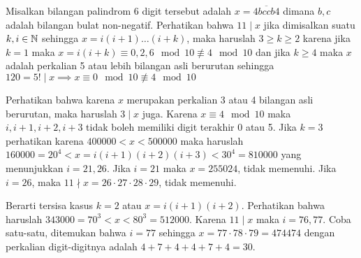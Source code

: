 
\begin{solusi}
    Misalkan bilangan palindrom 6 digit tersebut adalah $x=\overline{4bccb4}$ dimana $b,c$ adalah bilangan bulat non-negatif. Perhatikan bahwa $11 \mid x$ jika dimisalkan suatu $k,i \in \mathbb N$ sehingga $x = i(i+1)\dots(i+k)$, maka haruslah $3 \ge k \ge 2$ karena jika $k = 1$ maka $x = i(i+k) \equiv 0, 2, 6 \mod 10 \not \equiv 4 \mod 10$ dan jika $k \ge 4$ maka $x$ adalah perkalian 5 atau lebih bilangan asli berurutan sehingga $120 = 5! \mid x \implies x \equiv 0 \mod 10 \not \equiv 4 \mod 10$
    
    Perhatikan bahwa karena $x$ merupakan perkalian 3 atau 4 bilangan asli berurutan, maka haruslah $3 \mid x$ juga. Karena $x \equiv 4 \mod 10$ maka $i, i+1, i+2, i+3$ tidak boleh memiliki digit terakhir 0 atau 5. Jika $k=3$ perhatikan karena $400000 < x < 500000$ maka haruslah $160000 = 20^4 < x=i(i+1)(i+2)(i+3) < 30^4 = 810000$ yang menunjukkan $i=21,26$. Jika $i=21$ maka $x=255024$, tidak memenuhi. Jika $i=26$, maka $11 \nmid x=26\cdot27\cdot28\cdot29$, tidak memenuhi. 
    
    Berarti tersisa kasus $k=2$ atau $x=i(i+1)(i+2)$. Perhatikan bahwa haruslah $343000 = 70^3 < x < 80^3 = 512000$. Karena $11\mid x$ maka $i=76,77$. Coba satu-satu, ditemukan bahwa $i=77$ sehingga $x=77\cdot78\cdot79=474474$ dengan perkalian digit-digitnya adalah $4+7+4+4+7+4=30$.
\end{solusi}